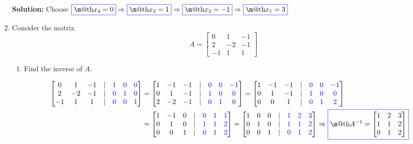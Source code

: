 \documentclass[14pt]{amsart}
\makeatletter
\newcommand{\?}{\stackrel{?}{=}}
\newcommand*{\boxedcolor}{blue}
\renewcommand{\boxed}[1]{\textcolor{\boxedcolor}{%
  \fbox{\normalcolor\m@th$\displaystyle#1$}}}
\makeatother
\begin{document}
\begin{enumerate}
\textbf{Solution:  }  Choose $\boxed{x_4 = 0} \Rightarrow \boxed{x_3 = 1} \Rightarrow \boxed{x_2 = -1}
\Rightarrow \boxed{x_1 = 3}$

\item  Consider the matrix
%
\begin{equation*}
A = \begin{bmatrix}
0 & 1 & -1\\
2 & -2 & -1\\
-1 & 1 & 1
\end{bmatrix}
\end{equation*}

\begin{enumerate}

\item  Find the inverse of $A$.

\begin{align*}
\begin{bmatrix}
0 & 1 & -1 & | & {\color{blue}1} & {\color{blue}0} & {\color{blue}0}\\
2 & -2 & -1 & | & {\color{blue}0} & {\color{blue}1} & {\color{blue}0}\\
-1 & 1 & 1 & | & {\color{blue}0} & {\color{blue}0} & {\color{blue}1}
\end{bmatrix} &= \begin{bmatrix}
1 & -1 & -1 & | & {\color{blue}0} & {\color{blue}0} & {\color{blue}-1}\\
0 & 1 & -1 & | & {\color{blue}1} & {\color{blue}0} & {\color{blue}0}\\
2 & -2 & -1 & | & {\color{blue}0} & {\color{blue}1} & {\color{blue}0}
\end{bmatrix} = \begin{bmatrix}
1 & -1 & -1 & | & {\color{blue}0} & {\color{blue}0} & {\color{blue}-1}\\
0 & 1 & -1 & | & {\color{blue}1} & {\color{blue}0} & {\color{blue}0}\\
0 & 0 & 1 & | & {\color{blue}0} & {\color{blue}1} & {\color{blue}2}
\end{bmatrix}\\
 &= \begin{bmatrix}
1 & -1 & 0 & | & {\color{blue}0} & {\color{blue}1} & {\color{blue}1}\\
0 & 1 & 0 & | & {\color{blue}1} & {\color{blue}1} & {\color{blue}2}\\
0 & 0 & 1 & | & {\color{blue}0} & {\color{blue}1} & {\color{blue}2}
\end{bmatrix} = \begin{bmatrix}
1 & 0 & 0 & | & {\color{blue}1} & {\color{blue}2} & {\color{blue}3}\\
0 & 1 & 0 & | & {\color{blue}1} & {\color{blue}1} & {\color{blue}2}\\
0 & 0 & 1 & | & {\color{blue}0} & {\color{blue}1} & {\color{blue}2}
\end{bmatrix} \Rightarrow \boxed{A^{-1} = \begin{bmatrix}
1 & 2 & 3\\
1 & 1 & 2\\
0 & 1 & 2
\end{bmatrix}}
\end{align*}


\end{enumerate}
\end{enumerate}
\end{document}

